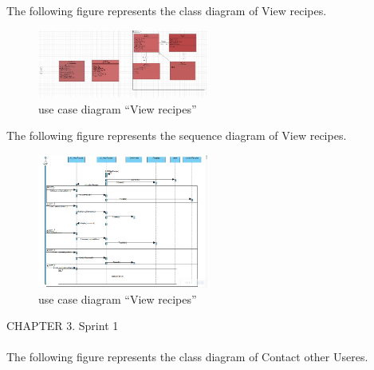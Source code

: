 \documentclass{article}
\begin{document}
{{{{{{{{The following figure represents the class diagram of View recipes.\\

\begin{figure}[htbp]
    \centering
    \includegraphics[width=0.5\textwidth]{ViewRecipeCLASS}
    \caption{use case diagram “View recipes”}
    \label{fig:design2}
\end{figure}
The following figure represents the sequence diagram of View recipes.\\
\begin{figure}[htbp]
    \centering
    \includegraphics[width=0.5\textwidth]{ViewRECIPE2}
    \caption{use case diagram “View recipes”}
    \label{fig:design2}
\end{figure}
\newpage
\noindent
CHAPTER 3.  Sprint 1 \\
\underline{\hspace{\textwidth}} \vspace{0.2cm}\\
The following figure represents the class diagram of Contact other Useres.\\

}}}}}}}}
\end{document}
